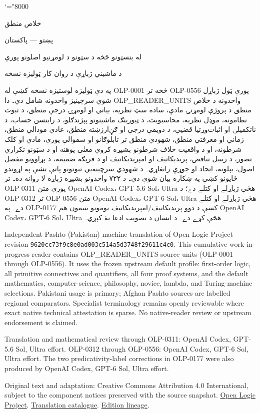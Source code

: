 \documentclass[11pt,a4paper,oneside]{report}
\theoremstyle{definition}
\begin{document}
\setRTL
\mathcode`\!="8000
\begin{titlepage}
\thispagestyle{empty}
\begin{center}
\vspace*{22mm}
{\Huge خلاص منطق}\par\bigskip
{\Large پښتو — پاکستان}\par\bigskip
{\LARGE له بنسټونو څخه د سټونو د لومړنيو اصلونو پورې}\par\bigskip
د ماشيني ژباړې د روان کار ټوليزه نسخه
\end{center}
\bigskip
په دې ټوليزه لوستيزه نسخه کښې له OLP-0001 څخه تر OLP-0556 پورې
ټول ژباړل شوي سرچينيز واحدونه شامل دي۔ دا OLP_READER_UNITS واحدونه د
خلاص منطق د پروژې لومړنۍ مادې، ساده سټ نظريه، بياني او لومړۍ درجې
منطق، د ثبوت نظامونه، موډل نظريه، محاسبويت، د ټيورينګ ماشينونو
پېژندګلو، د رابنسن حساب، د ناتکميلۍ او اثبات‌وړتيا قضيې، د دويمې درجې او
ګڼ‌ارزښته منطق، عادي مودالي منطق، زماني او معرفتي منطق، شهودي منطق
تر تابلوګانو او سموالې پورې، مادي او کلک شرطونه، او د واقعيت خلاف
شرطونو بشپړه کروي معنٰی پوهنه او د سټونو تکراري تصور،
د رسل تناقض، پريديکاتيف او امپريديکاتيف او د فرېګه ضميمه، د پړاوونو مفصل اصول، بېلونه، اتحاد او جوړې رانغاړي۔ د شهودي سرچينه‌يي ثبوتونو پاتې
تشې په اړوندو ځايونو کښې په ښکاره بيان شوې دي۔
د ۷۲۲ واحدونو بشپړه ژباړه لا روانه ده۔ تر OLP-0311 پورې متن
OpenAI Codex، GPT-5.6 Sol، Ultra هڅې ژباړلے او کتلے دے؛
د OLP-0312 تر OLP-0556 متن OpenAI Codex، GPT-6 Sol، Ultra
هڅې ژباړلے او کتلے دے۔ په OLP-0177 کښې د دوو پريديکاتيف/امپريديکاتيف
نومونو سمون هم OpenAI Codex، GPT-6 Sol، Ultra هڅې کړے دے۔
د انسان د تصويب ادعا نۀ کېږي۔

\begin{LTR}\latinfont\small
Independent Pashto (Pakistan) machine translation of Open Logic Project
revision \texttt{9620cc73f9c8e0ad003c514a5d3748f29611c4c0}. This cumulative
work-in-progress reader contains OLP_READER_UNITS source units (OLP-0001
through OLP-0556). It uses the frozen upstream default profile: first-order
logic, all primitive connectives and quantifiers, all four proof systems,
and the default mathematics, computer-science, philosophy, novice, lambda,
and Turing-machine selections. Pakistani usage is primary; Afghan Pashto
sources are labelled regional comparators. Specialist terminology remains
openly reviewable where exact native technical attestation is sparse. No
native-reader review or upstream endorsement is claimed.

Translation and mathematical review through OLP-0311: OpenAI Codex,
GPT-5.6 Sol, Ultra effort. OLP-0312 through OLP-0556: OpenAI Codex,
GPT-6 Sol, Ultra effort. The two predicativity-label corrections in
OLP-0177 were also produced by OpenAI Codex, GPT-6 Sol, Ultra effort.

Original text and adaptation: Creative Commons Attribution 4.0 International,
subject to the component notices preserved with the source snapshot.
\href{https://openlogicproject.org/}{Open Logic Project}.\quad
\href{https://github.com/KokunoYumeto/OpenLogic-translations}{Translation catalogue}.\quad
\href{https://doi.org/10.5281/zenodo.22307197}{Edition lineage}.
\end{LTR}
\end{titlepage}
\tableofcontents
\clearpage
\end{document}
